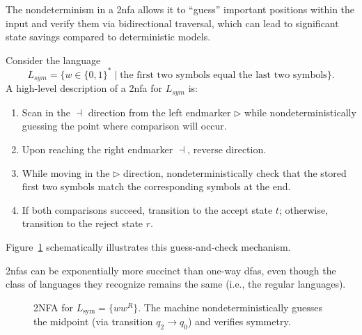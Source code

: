 \begin{remark}
The nondeterminism in a \gls{2nfa} allows it to “guess” important positions within the input and verify them via bidirectional traversal, which can lead to significant state savings compared to deterministic models.
\end{remark}

\begin{example}
Consider the language 
\[
L_{sym} = \{ w \in \{0,1\}^* \mid \text{the first two symbols equal the last two symbols} \}.
\]
A high-level description of a \gls{2nfa} for \(L_{sym}\) is:
\begin{enumerate}
    \item Scan in the \(\dashv\) direction from the left endmarker \(\triangleright\) while nondeterministically guessing the point where comparison will occur.
    \item Upon reaching the right endmarker \(\dashv\), reverse direction.
    \item While moving in the \(\triangleright\) direction, nondeterministically check that the stored first two symbols match the corresponding symbols at the end.
    \item If both comparisons succeed, transition to the accept state \(t\); otherwise, transition to the reject state \(r\).
\end{enumerate}
Figure~\ref{fig:2nfa-example} schematically illustrates this guess-and-check mechanism.
\end{example}

\begin{observation}
\glspl{2nfa} can be exponentially more succinct than one-way \glspl{dfa}, even though the class of languages they recognize remains the same (i.e., the regular languages).
\end{observation}

\begin{figure}[h]
    \centering  
    \caption{2NFA for \(L_{\text{sym}} = \{ww^R\}\). The machine nondeterministically guesses the midpoint (via transition \(q_2 \to q_0\)) and verifies symmetry.}
    \label{fig:2nfa-example}
\end{figure}

